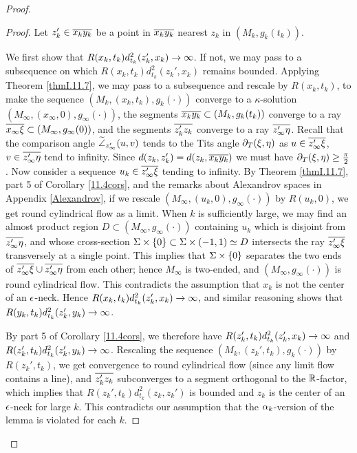 \begin{proof}
\begin{proof}
 Let $z_k'\in\overline{x_ky_k}$ be a point in $\overline{x_ky_k}$
nearest $z_k$ in $(M_k,g_k(t_k))$.



We first show that $R(x_k,t_k)d_{t_k}^2(z_k',x_k)\rightarrow\infty$.
If not, we may pass to a subsequence on which $R(x_k,t_k)d_{t_k}^2(z_k',x_k)$
remains bounded.   Applying Theorem \ref{thmI.11.7}, we may
pass to a subsequence and
rescale by $R(x_k,t_k)$,
to make the sequence $(M_k,(x_k,t_k),g_k(\cdot))$
converge to a $\kappa$-solution $(M_\infty,(x_\infty,0),g_\infty(\cdot))$,
the segments $\overline{x_ky_k}\subset (M_k,g_k(t_k))$
converge to a ray $\overline{x_\infty\xi}\subset (M_\infty,g_\infty(0))$,
and the segments $\overline{z_k'z_k}$ converge to
a ray $\overline{z_\infty'\eta}$.  Recall that the comparison angle
$\widetilde{\angle}_{z^\prime_\infty}(u,v)$ tends to the Tits angle
$\partial_T(\xi,\eta)$ as $u\in\overline{z_\infty'\xi}$, $v\in \overline{z_\infty'\eta}$
tend to infinity.  Since $d(z_k,z_k')=d(z_k,\overline{x_ky_k})$ we must
have $\partial_T(\xi,\eta)\geq\frac{\pi}{2}$.  Now consider a sequence
$u_k\in \overline{z_\infty'\xi}$ tending to infinity.  By
Theorem \ref{thmI.11.7}, part 5 of Corollary \ref{11.4cors},
and the remarks about Alexandrov spaces in Appendix \ref{Alexandrov},
if we rescale $(M_\infty,(u_k,0),g_\infty(\cdot))$ by $R(u_k,0)$,
we get round cylindrical flow as a limit.   When $k$ is sufficiently
large,
we may find an almost product region $D\subset (M_\infty,g_\infty(\cdot))$
containing $u_k$ which is disjoint from $\overline{z_\infty'\eta}$,
and whose cross-section $\Sigma\times\{0\}\subset\Sigma\times (-1,1)\simeq D$
intersects the ray $\overline{z_\infty'\xi}$ transversely at a single point.
This implies that $\Sigma\times \{0\}$ separates the two ends
of $\overline{z_\infty'\xi}\cup\overline{z_\infty'\eta}$ from each other; hence
$M_\infty$ is two-ended, and $(M_\infty,g_\infty(\cdot))$ is round
cylindrical flow.   This contradicts the assumption that
$x_k$ is not the center of
an $\epsilon$-neck.  Hence $R(x_k,t_k)d_{t_k}^2(z_k',x_k)\rightarrow\infty$,
and similar reasoning shows that $R(y_k,t_k)d_{t_k}^2(z_k',y_k)\rightarrow\infty$.

By part 5 of Corollary \ref{11.4cors}, we therefore have
$R(z_k',t_k)d_{t_k}^2(z_k',x_k)\rightarrow\infty$ and
$R(z_k',t_k)d_{t_k}^2(z_k',y_k)\rightarrow\infty$.  Rescaling the sequence
$(M_k,(z_k',t_k),g_k(\cdot))$ by
$R(z_k',t_k)$, we get convergence to round cylindrical flow
(since any limit flow contains a line), and $\overline{z_k'z_k}$
subconverges to a segment orthogonal to the ${\mathbb R}$-factor, which
implies that $R(z_k',t_k)d_{t_k}^2(z_k,z_k')$ is bounded
and $z_k$ is the center of an $\epsilon$-neck for large $k$.  This contradicts
our assumption that the $\alpha_k$-version of the lemma is
violated for each $k$.
\end{proof}


\end{proof}
